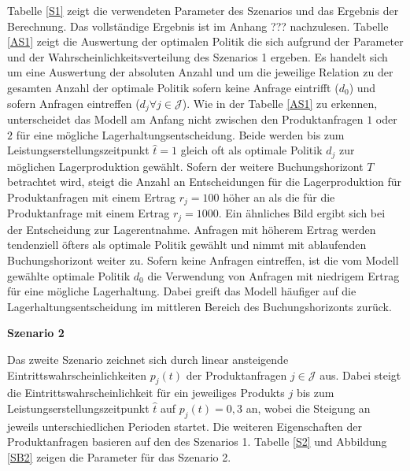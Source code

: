 Tabelle \ref{S1} zeigt die verwendeten Parameter des Szenarios und das Ergebnis der Berechnung. Das vollständige Ergebnis ist im Anhang ??? nachzulesen. Tabelle \ref{AS1} zeigt die Auswertung der optimalen Politik die sich aufgrund der Parameter und der Wahrscheinlichkeitsverteilung des Szenarios 1 ergeben. Es handelt sich um eine Auswertung der absoluten Anzahl und um die jeweilige Relation zu der gesamten Anzahl der optimale Politik sofern keine Anfrage eintrifft ($d_0$) und sofern Anfragen eintreffen ($d_j\forall j \in\mathcal{J}$). Wie in der Tabelle \ref{AS1} zu erkennen, unterscheidet das Modell am Anfang nicht zwischen den Produktanfragen $1$ oder $2$ für eine mögliche Lagerhaltungsentscheidung. Beide werden bis zum Leistungserstellungszeitpunkt $\hat t=1$ gleich oft als optimale Politik $d_{j}$ zur möglichen Lagerproduktion gewählt. Sofern der weitere Buchungshorizont $T$ betrachtet wird, steigt die Anzahl an Entscheidungen für die Lagerproduktion für Produktanfragen mit einem Ertrag $r_j=100$ höher an als die für die Produktanfrage mit einem Ertrag $r_j=1000$. Ein ähnliches Bild ergibt sich bei der Entscheidung zur Lagerentnahme. Anfragen mit höherem Ertrag werden tendenziell öfters als optimale Politik gewählt und nimmt mit ablaufenden Buchungshorizont weiter zu. Sofern keine Anfragen eintreffen, ist die vom Modell gewählte optimale Politik $d_{0}$ die Verwendung von Anfragen mit niedrigem Ertrag für eine mögliche Lagerhaltung. Dabei greift das Modell häufiger auf die Lagerhaltungsentscheidung im mittleren Bereich des Buchungshorizonts zurück.

\textbf{Szenario 2}

Das zweite Szenario zeichnet sich durch linear ansteigende Eintrittswahrscheinlichkeiten $p_j(t)$ der Produktanfragen $j\in\mathcal{J}$ aus. Dabei steigt die Eintrittswahrscheinlichkeit für ein jeweiliges Produkts $j$ bis zum Leistungserstellungszeitpunkt $\hat t$ auf $p_j(t)=0,3$ an, wobei die Steigung an jeweils unterschiedlichen Perioden startet. Die weiteren Eigenschaften der Produktanfragen basieren auf den des Szenarios 1. Tabelle \ref{S2} und Abbildung \ref{SB2} zeigen die Parameter für das Szenario 2.

